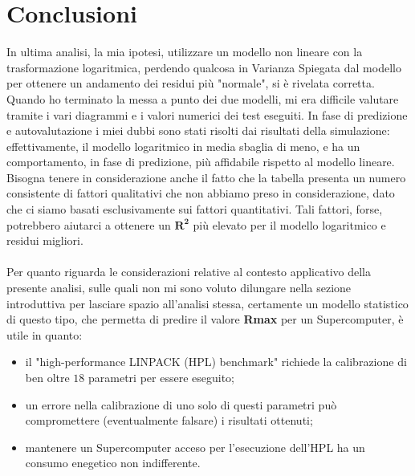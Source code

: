 \documentclass[11pt,a4paper]{article}
\begin{document}
\section{Conclusioni}
In ultima analisi, la mia ipotesi, utilizzare un modello non lineare con la
trasformazione logaritmica, perdendo qualcosa in Varianza Spiegata dal
modello per ottenere un andamento dei residui pi\`u "normale", si \`e rivelata
corretta. Quando ho terminato la messa a punto dei due modelli, mi era difficile
valutare tramite i vari diagrammi e i valori numerici dei test eseguiti. In fase
di predizione e autovalutazione i miei dubbi sono stati risolti dai risultati
della simulazione: effettivamente, il modello logaritmico in media sbaglia di
meno, e ha un comportamento, in fase di predizione, pi\`u affidabile rispetto al
modello lineare.\\
Bisogna tenere in considerazione anche il fatto che la tabella presenta un
numero consistente di fattori qualitativi che non abbiamo preso in
considerazione, dato che ci siamo basati esclusivamente sui fattori
quantitativi. Tali fattori, forse, potrebbero aiutarci a ottenere un
$\boldsymbol{R^2}$ pi\`u elevato per il modello logaritmico e residui
migliori.\\
\\
Per quanto riguarda le considerazioni relative al contesto applicativo della
presente analisi, sulle quali non mi sono voluto dilungare nella sezione
introduttiva per lasciare spazio all'analisi stessa, certamente un modello
statistico di questo tipo, che permetta di predire il valore \textbf{Rmax} per
un Supercomputer, \`e utile in quanto:
\begin{itemize}
	\setlength\itemsep{0mm}
	\item il "high-performance LINPACK (HPL) benchmark" richiede la
		calibrazione di ben oltre $18$ parametri per essere eseguito;
	\item un errore nella calibrazione di uno solo di questi parametri pu\`o
		compromettere (eventualmente falsare) i risultati ottenuti;
	\item mantenere un Supercomputer acceso per l'esecuzione dell'HPL ha un
		consumo enegetico non indifferente.
\end{itemize}
\end{document}
